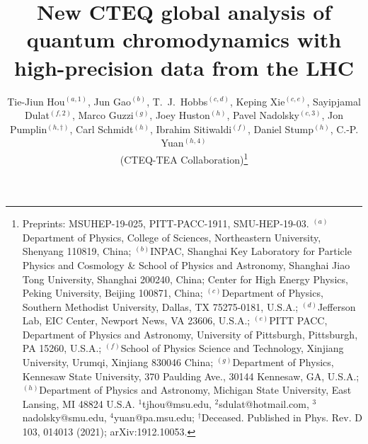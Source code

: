 \documentclass[11pt]{article}
\begin{document}
\title{New CTEQ global analysis of quantum chromodynamics with high-precision data from the LHC}
\author{Tie-Jiun Hou$^{(a,1)}$, Jun Gao$^{(b)}$, T.~J.~Hobbs$^{(c,d)}$, Keping Xie$^{(c,e)}$, Sayipjamal Dulat$^{(f,2)}$, Marco Guzzi$^{(g)}$, Joey Huston$^{(h)}$, Pavel Nadolsky$^{(c,3)}$, Jon Pumplin$^{(h,\dag)}$, Carl Schmidt$^{(h)}$, Ibrahim Sitiwaldi$^{(f)}$, Daniel Stump$^{(h)}$, C.-P. Yuan$^{(h,4)}$\\[4pt]
(CTEQ-TEA Collaboration)\footnote{Preprints: MSUHEP-19-025, PITT-PACC-1911, SMU-HEP-19-03.
$^{(a)}$Department of Physics, College of Sciences, Northeastern University, Shenyang 110819, China;
$^{(b)}$INPAC, Shanghai Key Laboratory for Particle Physics and Cosmology \& School of Physics and Astronomy, Shanghai Jiao Tong University, Shanghai 200240, China; Center for High Energy Physics, Peking University, Beijing 100871, China;
$^{(c)}$Department of Physics, Southern Methodist University, Dallas, TX 75275-0181, U.S.A.;
$^{(d)}$Jefferson Lab, EIC Center, Newport News, VA 23606, U.S.A.;
$^{(e)}$PITT PACC, Department of Physics and Astronomy, University of Pittsburgh, Pittsburgh, PA 15260, U.S.A.;
$^{(f)}$School of Physics Science and Technology, Xinjiang University, Urumqi, Xinjiang 830046 China;
$^{(g)}$Department of Physics, Kennesaw State University, 370 Paulding Ave., 30144 Kennesaw, GA, U.S.A.;
$^{(h)}$Department of Physics and Astronomy, Michigan State University, East Lansing, MI 48824 U.S.A.
$^{1}$tjhou@msu.edu, $^{2}$sdulat@hotmail.com, $^{3}$nadolsky@smu.edu, $^{4}$yuan@pa.msu.edu;
$^{\dag}$Deceased.
Published in Phys. Rev. D 103, 014013 (2021); arXiv:1912.10053.}}
\date{}

\maketitle
\end{document}
